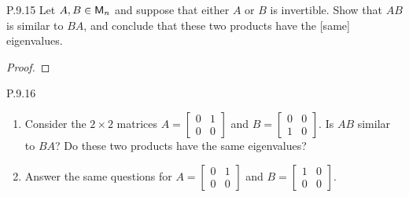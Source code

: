 \documentclass{../homework}
\date{Thursday 3/28}
\author{}
\begin{document}
\begin{problems}
\item[P.9.15] Let \(A, B \in \mathsf{M}_n\) and suppose that either \(A\) or
  \(B\) is invertible.  Show that \(AB\) is similar to \(BA\), and
  conclude that these two products have the [same] eigenvalues.

  \begin{solution}
    \begin{proof}

    \end{proof}
  \end{solution}

\item[P.9.16]
  \begin{enumerate}
  \item Consider the \(2\times2\) matrices \(A =
    \begin{bmatrix}
      0 & 1 \\ 0 & 0
    \end{bmatrix}
    \) and \(B =
    \begin{bmatrix}
      0 & 0 \\ 1 & 0
    \end{bmatrix}
    \).  Is \(AB\) similar to \(BA\)?  Do these two products have the
    same eigenvalues?

    \begin{solution}

    \end{solution}

  \item Answer the same questions for
    \(A = \begin{bmatrix} 0 & 1 \\ 0 & 0 \end{bmatrix}\) and
    \(B = \begin{bmatrix} 1 & 0 \\ 0 & 0 \end{bmatrix}\).

    \begin{solution}


\end{solution}
\end{enumerate}
\end{problems}
\end{document}
